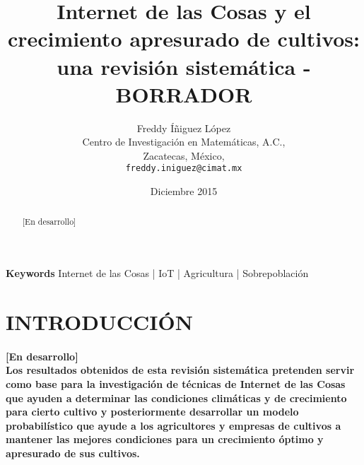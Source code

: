 \documentclass[10pt, twocolumn]{article}
\begin{document}
\title{\textbf{Internet de las Cosas y el crecimiento apresurado de cultivos: una revisión sistemática - BORRADOR}}
\author{Freddy Íñiguez López\\
	Centro de Investigación en Matemáticas, A.C.,\\
	Zacatecas, México,\\
	\texttt{freddy.iniguez@cimat.mx}}
\date{Diciembre 2015}
\maketitle

\begin{abstract}
[En desarrollo]
\end{abstract}
\paragraph{}
\textbf{Keywords} Internet de las Cosas | IoT | Agricultura | Sobrepoblación

\section{INTRODUCCIÓN}
\paragraph{[En desarrollo] \\ Los resultados obtenidos de esta revisión sistemática pretenden servir como base para la investigación de técnicas de Internet de las Cosas que ayuden a determinar las condiciones climáticas y de crecimiento para cierto cultivo y posteriormente desarrollar un modelo probabilístico que ayude a los agricultores y empresas de cultivos a mantener las mejores condiciones para un crecimiento óptimo y apresurado de sus cultivos.}
\end{document}
